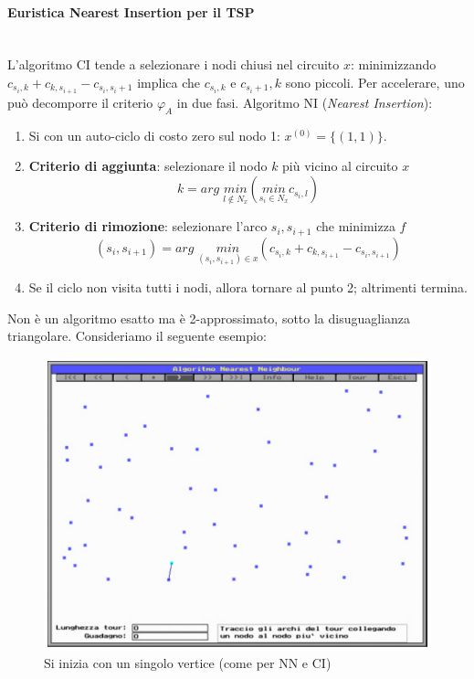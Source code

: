 \documentclass{article}
\begin{document}
\paragraph{Euristica Nearest Insertion per il TSP}\mbox{}\\
L'algoritmo CI tende a selezionare i nodi chiusi nel circuito $x$: minimizzando
$c_{s_i,k}+c_{k,s_{i+1}}-c_{s_i,s_i+1}$ implica che $c_{s_i,k}$ e $c_{s_i +1},k$ sono piccoli.
Per accelerare, uno può decomporre il criterio $\varphi_A$ in due fasi. Algoritmo NI (\textit{Nearest Insertion}):
\begin{enumerate}
    \item Si con un auto-ciclo di costo zero sul nodo 1: $x^{(0)}=\{(1,1)\}$.

    \item \textbf{Criterio di aggiunta}: selezionare il nodo $k$ più vicino al circuito $x$
          $$k=arg\;\underset{l \notin N_x}{min} \left( \underset{s_i \in N_x}{min}c_{s_i,l} \right)$$

    \item \textbf{Criterio di rimozione}: selezionare l'arco $s_i,s_{i+1}$ che minimizza $f$
          $$(s_i,s_{i+1})=arg\;\underset{(s_i,s_{i+1})\in x}{min} (c_{s_i,k}+c_{k,s_{i+1}}-c_{s_i,s_{i+1}})$$

    \item Se il ciclo non visita tutti i nodi, allora tornare al punto 2; altrimenti termina.
\end{enumerate}
Non è un algoritmo esatto ma è 2-approssimato, sotto la disuguaglianza triangolare. Consideriamo
il seguente esempio:

\begin{figure}[H]
    \centering
    \includegraphics[scale=0.5]{images/NI0.png}
    \caption{Si inizia con un singolo vertice (come per NN e CI)}
\end{figure}
\end{document}
